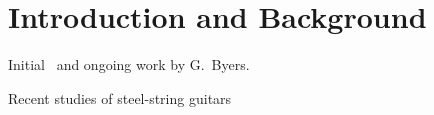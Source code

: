 %
%
%

 \section{Introduction and Background\label{sct:intro}}
Initial~\cite{ref:byersweb} and ongoing work by G.\ Byers\cite{ref:byers1996cgi}.

Recent studies of steel-string guitars~\cite{ref:varieschi2010icf}
